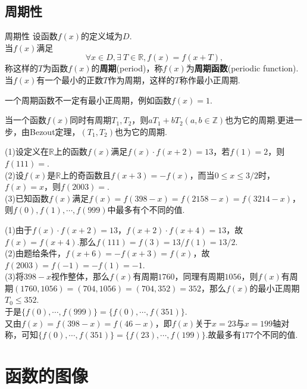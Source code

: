 \documentclass[lang=cn, zihao=5]{elegantbook}
\newcommand{\R}{\mathbb{R}}
\newcommand{\tk}{\uline{\hspace{4em}}}
\begin{document}
\vspace{3em}
\subsection{周期性}

\begin{definition}{周期性} %
    设函数$f(x)$的定义域为$D$.\\
    当$f(x)$满足$$\forall x \in D, \exists \ T \in \mathbb{R}, f(x)=f(x+T),$$
    称这样的$T$为函数$f(x)$的\textbf{周期}(period)，称$f(x)$为\textbf{周期函数}(periodic function).当$f(x)$有一个最小的正数$T$作为周期，这样的$T$称作最小正周期.
\end{definition}
\begin{remark}
    一个周期函数不一定有最小正周期，例如函数$f(x)=1$.
\end{remark}
\begin{remark}
    当一个函数$f(x)$同时有周期$T_1,T_2$，则$aT_1+bT_2(a,b \in \mathbb{Z})$也为它的周期.更进一步，由Bezout定理，$(T_1,T_2)$也为它的周期.
\end{remark}

\begin{example}
	(1)设定义在$\R$上的函数$f(x)$满足$f(x) \cdot f(x+2)=13$，若$f(1)=2$，则$f(111)=$\tk . \\
	(2)设$f(x)$是$\R$上的奇函数且$f(x+3)=-f(x)$，而当$0 \leq x \leq 3/2$时，$f(x)=x$，则$f(2003)=$\tk . \\
	(3)已知函数$f(x)$满足$f(x)=f(398-x)=f(2158-x)=f(3214-x)$，则$f(0),f(1),\cdots ,f(999)$中最多有\tk 个不同的值.
\end{example}
\begin{solution}
	(1)由于$f(x) \cdot f(x+2)=13$，$f(x+2) \cdot f(x+4)=13$，故$f(x)=f(x+4)$.那么$f(111)=f(3)=13/f(1)=13/2$. \\
	(2)由题给条件，$f(x+6)=-f(x+3)=f(x)$，故$f(2003)=f(-1)=-f(1)=-1$. \\
	(3)将$398-x$视作整体，那么$f(x)$有周期$1760$，同理有周期$1056$，则$f(x)$有周期$(1760,1056)=(704,1056)=(704,352)=352$，那么$f(x)$的最小正周期$T_0 \leq 352$. \\
	于是$\{ f(0),\cdots ,f(999) \} = \{ f(0),\cdots ,f(351) \}$. \\
	又由$f(x)=f(398-x)=f(46-x)$，即$f(x)$关于$x=23$与$x=199$轴对称，可知$\{ f(0),\cdots ,f(351) \} = \{ f(23),\cdots ,f(199) \}$.故最多有$177$个不同的值.
\end{solution}

\newpage
\section{函数的图像}
\end{document}
